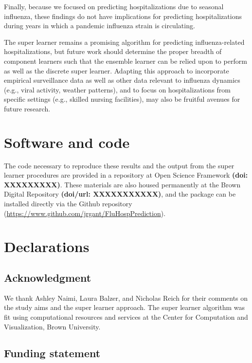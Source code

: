 \documentclass[10pt,letterpaper]{article}
\begin{document}
Finally, because we focused on predicting hospitalizations due to
seasonal influenza, these findings do not have implications for
predicting hospitalizations during years in which a pandemic influenza
strain is circulating.

The super learner remains a promising algorithm for predicting
influenza-related hospitalizations, but future work should determine the
proper breadth of component learners such that the ensemble learner can
be relied upon to perform as well as the discrete super learner.
Adapting this approach to incorporate empirical surveillance data as
well as other data relevant to influenza dynamics (e.g., viral activity,
weather patterns), and to focus on hospitalizations from specific
settings (e.g., skilled nursing facilities), may also be fruitful
avenues for future research.

\hypertarget{software-and-code}{%
\section{Software and code}\label{software-and-code}}

The code necessary to reproduce these results and the output from the
super learner procedures are provided in a repository at Open Science
Framework \textbf{(doi: XXXXXXXXX)}. These materials are also housed
permanently at the Brown Digital Repository \textbf{(doi/url:
XXXXXXXXXXX)}, and the package can be installed directly via the Github
repository (\url{https://www.github.com/jrgant/FluHospPrediction}).

\hypertarget{declarations}{%
\section{Declarations}\label{declarations}}

\hypertarget{acknowledgment}{%
\subsection{Acknowledgment}\label{acknowledgment}}

We thank Ashley Naimi, Laura Balzer, and Nicholas Reich for their
comments on the study aims and the super learner approach. The super
learner algorithm was fit using computational resources and services at
the Center for Computation and Visualization, Brown University.

\hypertarget{funding-statement}{%
\subsection{Funding statement}\label{funding-statement}}
\end{document}
